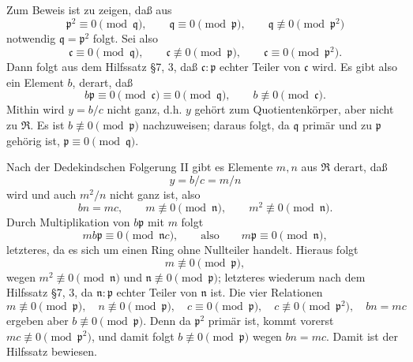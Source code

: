 \documentclass[11pt]{article}
\providecommand{\mR}{\mathfrak{R}}
\providecommand{\mc}{\mathfrak{c}}
\providecommand{\mn}{\mathfrak{n}}
\providecommand{\mpideal}{\mathfrak{p}}
\providecommand{\mq}{\mathfrak{q}}
\begin{document}
Zum Beweis ist zu zeigen, daß aus
\[
        \mpideal^2\equiv0\pmod{\mq},
        \qquad \mq\equiv0\pmod{\mpideal},
        \qquad \mq\not\equiv0\pmod{\mpideal^2}
\]
notwendig $\mq=\mpideal^2$ folgt. Sei also
\[
        \mc\equiv0\pmod{\mq},
        \qquad \mc\not\equiv0\pmod{\mpideal},
        \qquad \mc\equiv0\pmod{\mpideal^2}.
\]
Dann folgt aus dem Hilfssatz §7, 3, daß $\mc:\mpideal$ echter Teiler von $\mc$ wird. Es gibt also ein Element $b$, derart, daß
\[
        b\mpideal\equiv0\pmod{\mc}\equiv0\pmod{\mq},
        \qquad b\not\equiv0\pmod{\mc}.
\]
Mithin wird $y=b/c$ nicht ganz, d.h. $y$ gehört zum Quotientenkörper, aber nicht zu $\mR$. Es ist $b\not\equiv0\pmod{\mpideal}$ nachzuweisen; daraus folgt, da $\mq$ primär und zu $\mpideal$ gehörig ist, $\mpideal\equiv0\pmod{\mq}$.

Nach der Dedekindschen Folgerung II gibt es Elemente $m,n$ aus $\mR$ derart, daß
\[
        y=b/c=m/n
\]
wird und auch $m^2/n$ nicht ganz ist, also
\[
        bn=mc,
        \qquad m\not\equiv0\pmod{\mn},
        \qquad m^2\not\equiv0\pmod{\mn}.
\]
Durch Multiplikation von $b\mpideal$ mit $m$ folgt
\[
        mb\mpideal\equiv0\pmod{\mn c},
        \qquad\text{also}\qquad m\mpideal\equiv0\pmod{\mn},
\]
letzteres, da es sich um einen Ring ohne Nullteiler handelt. Hieraus folgt
\[
        m\not\equiv0\pmod{\mpideal},
\]
wegen $m^2\not\equiv0\pmod{\mn}$ und $\mn\not\equiv0\pmod{\mpideal}$; letzteres wiederum nach dem Hilfssatz §7, 3, da $\mn:\mpideal$ echter Teiler von $\mn$ ist. Die vier Relationen
\[
        m\not\equiv0\pmod{\mpideal},
        \quad n\not\equiv0\pmod{\mpideal},
        \quad c\equiv0\pmod{\mpideal},
        \quad c\not\equiv0\pmod{\mpideal^2},
        \quad bn=mc
\]
ergeben aber $b\not\equiv0\pmod{\mpideal}$. Denn da $\mpideal^2$ primär ist, kommt vorerst $mc\not\equiv0\pmod{\mpideal^2}$, und damit folgt $b\not\equiv0\pmod{\mpideal}$ wegen $bn=mc$. Damit ist der Hilfssatz bewiesen.
\end{document}
